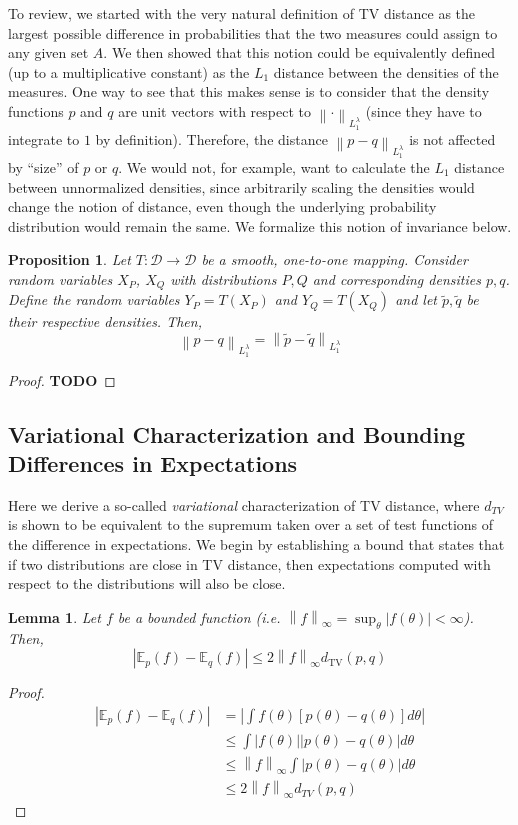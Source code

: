 \documentclass[12pt]{article}
\newcommand*{\norm}[1]{\left\lVert#1\right\rVert}
\newcommand*{\abs}[1]{\left\lvert#1\right\rvert}
\newcommand{\E}{\mathbb{E}}
\newtheorem{prop}{Proposition}
\newtheorem{lemma}{Lemma}
\begin{document}
To review, we started with the very natural definition of TV distance as the largest possible difference in probabilities that the two measures could assign to any given set $A$. We then showed that this notion could be equivalently defined (up to a multiplicative constant) as the $L_1$ distance between the densities of the measures. One way to see that this makes sense is to consider that the density functions $p$ and $q$ are unit vectors with respect to $\norm{\cdot}_{L_1^\lambda}$ (since they have to integrate to $1$ by definition). Therefore, the distance 
$\norm{p - q}_{L_1^\lambda}$ is not affected by ``size'' of $p$ or $q$. We would not, for example, want to calculate the $L_1$ distance between unnormalized densities, since arbitrarily scaling the densities would change the notion of distance, even though the underlying probability distribution would remain the same. We formalize this notion of invariance below. 
\begin{prop}
Let $T: \mathcal{D} \to \mathcal{D}$ be a smooth, one-to-one mapping. Consider random variables $X_P$, $X_Q$ with distributions $P, Q$ and corresponding densities $p, q$. Define the random variables $Y_P = T(X_P)$ and $Y_Q = T(X_Q)$ and 
let $\tilde{p}, \tilde{q}$ be their respective densities. Then, 
\[\norm{p - q}_{L_1^{\lambda}} = \norm{\tilde{p} - \tilde{q}}_{L_1^{\lambda}}\]
\end{prop}

\begin{proof}
\textbf{TODO}
\end{proof}

\subsection{Variational Characterization and Bounding Differences in Expectations}
Here we derive a so-called \textit{variational} characterization of TV distance, where $d_{TV}$ is shown to be equivalent to the supremum taken over a set of test functions of the difference in expectations. 
We begin by establishing a bound that states that if two distributions are close in TV distance, then expectations computed with respect to the distributions will also be close. 
\begin{lemma} 
Let $f$ be a bounded function (i.e. $\norm{f}_\infty = \sup_{\theta} \abs{f(\theta)} < \infty$). Then, 
\[\abs{\E_p(f) - \E_q(f)} \leq 2\norm{f}_\infty d_{\text{TV}}(p, q)\]
\end{lemma}

\begin{proof}
\begin{align*}
\abs{\E_p(f) - \E_q(f)} &= \abs{\int f(\theta)[p(\theta) - q(\theta)] d\theta} \\
				 &\leq \int \abs{f(\theta)} \abs{p(\theta) - q(\theta)} d\theta \\
				 &\leq \norm{f}_{\infty} \int  \abs{p(\theta) - q(\theta)} d\theta \\
				 &\leq 2\norm{f}_{\infty} d_{TV}(p, q)
\end{align*}
\end{proof}
\end{document}
